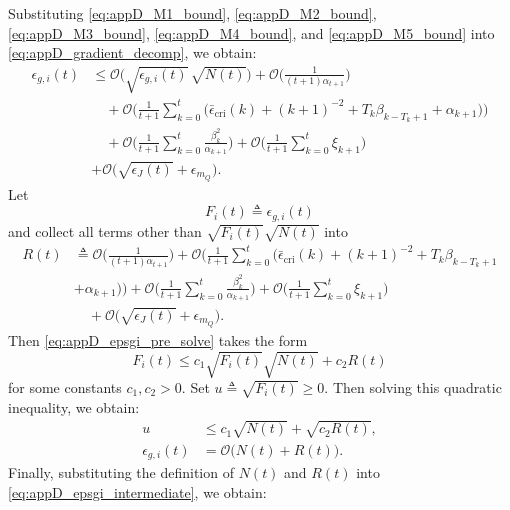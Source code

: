 \documentclass{IEEEtran}
\begin{document}
Substituting \eqref{eq:appD_M1_bound}, \eqref{eq:appD_M2_bound}, \eqref{eq:appD_M3_bound}, \eqref{eq:appD_M4_bound}, and \eqref{eq:appD_M5_bound} into \eqref{eq:appD_gradient_decomp}, we obtain: 
\begin{equation}
\begin{aligned}
\epsilon_{g,i}(t)
&\le \mathcal{O}\!\Big(\sqrt{\epsilon_{g,i}(t)}\,\sqrt{N(t)}\Big)
+\mathcal{O}\!\Big(\frac{1}{(t+1)\alpha_{t+1}}\Big)\\
&\quad +\mathcal{O}\!\Bigg(\frac{1}{t+1}\sum_{k=0}^{t}\Big(
\bar{\epsilon}_{\mathrm{cri}}(k)+(k+1)^{-2}+T_k\beta_{k-T_k+1}+\alpha_{k+1}
\Big)\Bigg)\\
&\quad +\mathcal{O}\!\Bigg(\frac{1}{t+1}\sum_{k=0}^{t}
\frac{\beta_k^2}{\alpha_{k+1}}\Bigg)
+\mathcal{O}\!\Bigg(\frac{1}{t+1}\sum_{k=0}^{t}\xi_{k+1}\Bigg)\\
&+\mathcal{O}\!\Big(\sqrt{\epsilon_J(t)}+\epsilon_{m_Q}\Big).
\end{aligned}
\label{eq:appD_epsgi_pre_solve}
\end{equation}
Let
\begin{equation}
F_i(t)\triangleq \epsilon_{g,i}(t)
\end{equation}
and collect all terms other than $\sqrt{F_i(t)}\sqrt{N(t)}$ into
\begin{equation}
\begin{aligned}
R(t)
&\triangleq \mathcal{O}\!\Big(\frac{1}{(t+1)\alpha_{t+1}}\Big)
+\mathcal{O}\!\Bigg(\frac{1}{t+1}\sum_{k=0}^{t}\Big(
\bar{\epsilon}_{\mathrm{cri}}(k)+(k+1)^{-2}+T_k\beta_{k-T_k+1}
\\&+\alpha_{k+1}\Big)\Bigg)+\mathcal{O}\!\Bigg(\frac{1}{t+1}\sum_{k=0}^{t}
\frac{\beta_k^2}{\alpha_{k+1}}\Bigg)
+\mathcal{O}\!\Bigg(\frac{1}{t+1}\sum_{k=0}^{t}\xi_{k+1}\Bigg)\\
&\quad +\mathcal{O}\!\Big(\sqrt{\epsilon_J(t)}+\epsilon_{m_Q}\Big).
\end{aligned}
\label{eq:appD_R_def}
\end{equation}
Then \eqref{eq:appD_epsgi_pre_solve} takes the form
\begin{equation}
F_i(t)\le c_1\sqrt{F_i(t)}\sqrt{N(t)}+c_2R(t)
\label{eq:appD_quadratic_ineq}
\end{equation}
for some constants $c_1,c_2>0$. Set $u\triangleq \sqrt{F_i(t)}\ge 0$. Then solving this quadratic inequality, we obtain: 
\begin{equation}
\begin{aligned}
u
&\le c_1\sqrt{N(t)}+\sqrt{c_2R(t)},\\
\epsilon_{g,i}(t)
&=\mathcal{O}\!\big(N(t)+R(t)\big).
\end{aligned}
\label{eq:appD_epsgi_intermediate}
\end{equation}
Finally, substituting the definition of $N(t)$ and $R(t)$ into \eqref{eq:appD_epsgi_intermediate}, we obtain:
\end{document}
